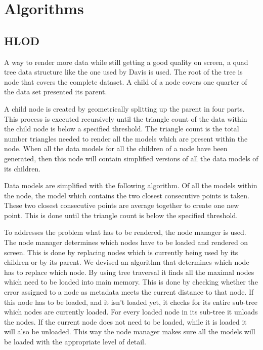 \section{Algorithms}
\label{sec:Algorithms}
\subsection{HLOD}
\label{subsec:HLOD}
A way to render more data while still getting a good quality on screen, a quad tree data structure like the one used by Davis \cite{Davis} is used. The root of the tree is node that covers the complete dataset. A child of a node covers one quarter of the data set presented its parent.

A child node is created by geometrically splitting up the parent in four parts. This process is executed recursively until the triangle count of the data within the child node is below a specified threshold. The triangle count is the total number triangles needed to render all the models which are present within the node. When all the data models for all the children of a node have been generated, then this node will contain simplified versions of all the data models of its children.

Data models are simplified with the following algorithm. Of all the models within the node, the model which contains the two closest consecutive points is taken. These two closest consecutive points are average together to create one new point. This is done until the triangle count is below the specified threshold.

To addresses the problem what has to be rendered, the node manager is used. The node manager determines which nodes have to be loaded and rendered on screen. This is done by replacing nodes which is currently being used by its children or by its parent. We devised an algorithm that determines which node has to replace which node. By using tree traversal it finds all the maximal nodes which need to be loaded into main memory. This is done by checking whether the error assigned to a node as metadata meets the current distance to that node. If this node has to be loaded, and it isn’t loaded yet, it checks for its entire sub-tree which nodes are currently loaded. For every loaded node in its sub-tree it unloads the nodes. If the current node does not need to be loaded, while it is loaded it will also be unloaded. This way the node manager makes sure all the models will be loaded with the appropriate level of detail.

